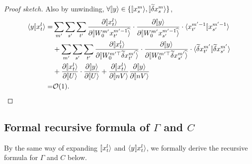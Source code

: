 \documentclass{article}
\theoremstyle{plain}
\theoremstyle{definition}
\begin{document}
\begin{proof}[Proof sketch]
Also by unwinding, $\forall \ket{y}\in \{\ket{x_s^m}, \ket{\tilde \del x_s^m}\}$,
\begin{align*}
    \braket{y}{x_t^l}= & \sum_{m'}\sum_{s'}\sum_{t'} \frac{\partial \ket{x_t^l}}{\partial \hatket{W_0^{m'}x_{t'}^{m'-1}}}\cdot \frac{\partial \ket{y}}{\partial \hatket{W_0^{m'}x_{s'}^{m'-1}}}\cdot \braket{x_{t'}^{m'-1}}{x_{s'}^{m'-1}} \\
    & + \sum_{m'}\sum_{s'}\sum_{t'}  \frac{\partial \ket{x_t^l}}{\partial \hatket{W_0^{m'\top}\tilde \del x_{t'}^{m'}}}\cdot \frac{\partial \ket{y}}{\partial \hatket{W_0^{m'\top}\tilde \del x_{s'}^{m'}}}\cdot  \braket{\tilde \del x_{t'}^{m'}}{\tilde \del x_{s'}^{m'}}  \\
    & + 
    \frac{\partial \ket{x_t^l}}{\partial \ket{U}} \cdot 
    \frac{\partial \ket{y}}{\partial \ket{U}} + 
    \frac{\partial \ket{x_t^l}}{\partial \ket{nV}}
    \frac{\partial \ket{y}}{\partial \ket{nV}} \\
    = & \cO(1). \qedhere
\end{align*}
\end{proof}

\subsection{Formal recursive formula of $\Gamma$ and $C$}
By the same way of expanding $\ket{x_t^l}$ and $\braket{y}{x_t^l}$, we formally derive the recursive formula for $\Gamma$ and $C$ below.
\end{document}
